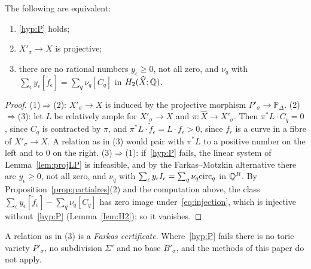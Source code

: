 \begin{proposition}\label{prop:projective}
The following are equivalent:
\begin{enumerate}
\item \ref{hyp:P} holds;
\item $X'_\sigma\to X$ is projective;
\item there are no rational numbers $y_\epsilon\ge0$, not all zero, and $\nu_q$ with
$\sum_\epsilon y_\epsilon[\tilde f_\epsilon]=\sum_q\nu_q[C_q]$ in $H_2(\widehat X;\mathbb Q)$.
\end{enumerate}
\end{proposition}

\begin{proof}
(1)$\Rightarrow$(2): $X'_\sigma\to X$ is induced by the projective morphism $P'_\sigma\to\mathbb P_\Delta$. (2)$\Rightarrow$(3): let $L$ be relatively
ample for $X'_\sigma\to X$ and $\pi\colon\widehat X\to X'_\sigma$. Then $\pi^*L\cdot C_q=0$, since $C_q$ is contracted by $\pi$, and
$\pi^*L\cdot\tilde f_\epsilon=L\cdot f_\epsilon>0$, since $f_\epsilon$ is a curve in a fibre of $X'_\sigma\to X$. A relation as in (3) would pair with
$\pi^*L$ to a positive number on the left and to $0$ on the right. (3)$\Rightarrow$(1): if~\ref{hyp:P} fails, the linear system of
Lemma~\ref{lem:projLP} is infeasible, and by the Farkas--Motzkin alternative there are $y_\epsilon\ge0$, not all zero, and $\nu_q$ with
$\sum_\epsilon y_\epsilon I_\epsilon=\sum_q\nu_q\mathrm{circ}_q$ in $\mathbb Q^R$. By Proposition~\ref{prop:partialres}(2) and the computation above, the class
$\sum_\epsilon y_\epsilon[\tilde f_\epsilon]-\sum_q\nu_q[C_q]$ has zero image under~\eqref{eq:injection}, which is injective without~\ref{hyp:P}
(Lemma~\ref{lem:H2}); so it vanishes.
\end{proof}

A relation as in (3) is a \emph{Farkas certificate}. Where~\ref{hyp:P} fails there is no toric variety $P'_\sigma$, no subdivision
$\Sigma'$ and no base $B'_\sigma$, and the methods of this paper do not apply.
